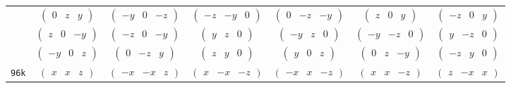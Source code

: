 \documentclass[fleqn,9pt,landscape]{jsarticle}
\begin{document}
\begin{center}
\begin{longtable}{ccccccc}
& $ \begin{pmatrix} 0 & z & y \end{pmatrix} $ & $ \begin{pmatrix} - y & 0 & - z \end{pmatrix} $ & $ \begin{pmatrix} - z & - y & 0 \end{pmatrix} $ & $ \begin{pmatrix} 0 & - z & - y \end{pmatrix} $ & $ \begin{pmatrix} z & 0 & y \end{pmatrix} $ & $ \begin{pmatrix} - z & 0 & y \end{pmatrix} $ \\
& $ \begin{pmatrix} z & 0 & - y \end{pmatrix} $ & $ \begin{pmatrix} - z & 0 & - y \end{pmatrix} $ & $ \begin{pmatrix} y & z & 0 \end{pmatrix} $ & $ \begin{pmatrix} - y & z & 0 \end{pmatrix} $ & $ \begin{pmatrix} - y & - z & 0 \end{pmatrix} $ & $ \begin{pmatrix} y & - z & 0 \end{pmatrix} $ \\
& $ \begin{pmatrix} - y & 0 & z \end{pmatrix} $ & $ \begin{pmatrix} 0 & - z & y \end{pmatrix} $ & $ \begin{pmatrix} z & y & 0 \end{pmatrix} $ & $ \begin{pmatrix} y & 0 & z \end{pmatrix} $ & $ \begin{pmatrix} 0 & z & - y \end{pmatrix} $ & $ \begin{pmatrix} - z & y & 0 \end{pmatrix} $ \\ \hline
{\tt 96k} & $ \begin{pmatrix} x & x & z \end{pmatrix} $ & $ \begin{pmatrix} - x & - x & z \end{pmatrix} $ & $ \begin{pmatrix} x & - x & - z \end{pmatrix} $ & $ \begin{pmatrix} - x & x & - z \end{pmatrix} $ & $ \begin{pmatrix} x & x & - z \end{pmatrix} $ & $ \begin{pmatrix} z & - x & x \end{pmatrix} $ \\

\end{longtable}
\end{center}
\end{document}
